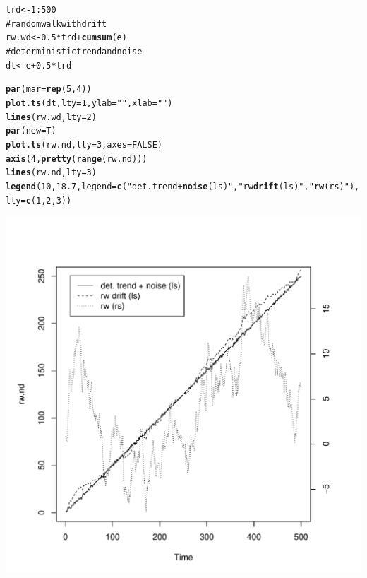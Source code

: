 \documentclass{article}\usepackage{graphicx, color}
\makeatletter
\def\maxwidth{ %
  \ifdim\Gin@nat@width>\linewidth
    \linewidth
  \else
    \Gin@nat@width
  \fi
}
\newcommand{\hlfunctioncall}[1]{\textcolor[rgb]{0.501960784313725,0,0.329411764705882}{\textbf{#1}}}%
\newcommand{\hlstring}[1]{\textcolor[rgb]{0.6,0.6,1}{#1}}%
\newcommand{\hlcomment}[1]{\textcolor[rgb]{0.180392156862745,0.6,0.341176470588235}{#1}}%
\newenvironment{kframe}{%
 \def\at@end@of@kframe{}%
 \ifinner\ifhmode%
  \def\at@end@of@kframe{\end{minipage}}%
  \begin{minipage}{\columnwidth}%
 \fi\fi%
 \def\FrameCommand##1{\hskip\@totalleftmargin \hskip-\fboxsep
 \colorbox{shadecolor}{##1}\hskip-\fboxsep
     \hskip-\linewidth \hskip-\@totalleftmargin \hskip\columnwidth}%
 \MakeFramed {\advance\hsize-\width
   \@totalleftmargin\z@ \linewidth\hsize
   \@setminipage}}%
 {\par\unskip\endMakeFramed%
 \at@end@of@kframe}
\newenvironment{knitrout}{}{} %
\makeatother
\begin{document}
\begin{knitrout}
\color{fgcolor}\begin{kframe}
\begin{alltt}
trd <- 1:500
\hlcomment{# random walk with drift}
rw.wd <- 0.5 * trd + \hlfunctioncall{cumsum}(e)
\hlcomment{# deterministic trend and noise}
dt <- e + 0.5 * trd
\end{alltt}
\end{kframe}
\end{knitrout}

\begin{knitrout}
\color{fgcolor}\begin{kframe}
\begin{alltt}
\hlfunctioncall{par}(mar = \hlfunctioncall{rep}(5, 4))
\hlfunctioncall{plot.ts}(dt, lty = 1, ylab = \hlstring{""}, xlab = \hlstring{""})
\hlfunctioncall{lines}(rw.wd, lty = 2)
\hlfunctioncall{par}(new = T)
\hlfunctioncall{plot.ts}(rw.nd, lty = 3, axes = FALSE)
\hlfunctioncall{axis}(4, \hlfunctioncall{pretty}(\hlfunctioncall{range}(rw.nd)))
\hlfunctioncall{lines}(rw.nd, lty = 3)
\hlfunctioncall{legend}(10, 18.7, legend = \hlfunctioncall{c}(\hlstring{"det. trend + \hlfunctioncall{noise} (ls)"}, \hlstring{"rw \hlfunctioncall{drift} (ls)"}, \hlstring{"\hlfunctioncall{rw} (rs)"}), 
    lty = \hlfunctioncall{c}(1, 2, 3))
\end{alltt}
\end{kframe}
\includegraphics[width=\maxwidth]{figure/plotting} 

\end{knitrout}
\end{document}
